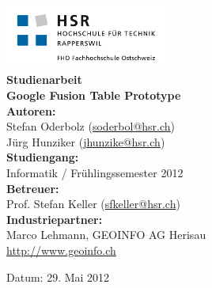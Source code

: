 \begin{titlepage}
\begin{flushleft}

\includegraphics[width=0.4\textwidth]{images/logo_hsr}
\\[3cm]

{\Large \bfseries Studienarbeit}\\[0.5cm]
{\Huge \bfseries Google Fusion Table Prototype}\\[2cm]

{ \large
	\textbf{Autoren:}\\
	Stefan Oderbolz (\url{soderbol@hsr.ch})\\
	Jürg Hunziker (\url{jhunzike@hsr.ch})\\[0.5cm]

	\textbf{Studiengang:}\\
	Informatik / Frühlingssemester 2012\\[1cm]
	
	\textbf{Betreuer:}\\
	Prof. Stefan Keller (\url{sfkeller@hsr.ch})\\[0.5cm]
	
	\textbf{Industriepartner:}\\
	Marco Lehmann, GEOINFO AG Herisau\\
	\url{http://www.geoinfo.ch}\\
}

\vfill
Datum: {29. Mai 2012}

\end{flushleft}
\end{titlepage}
